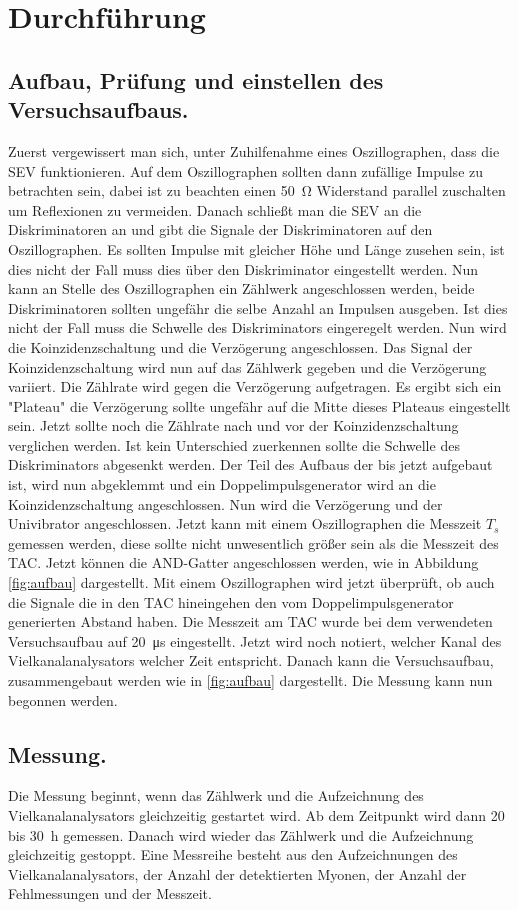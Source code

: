 \section{Durchführung}
\label{sec:Durchführung}
\subsection{Aufbau, Prüfung und einstellen des Versuchsaufbaus.}
Zuerst vergewissert man sich, unter Zuhilfenahme eines Oszillographen, dass die SEV funktionieren. 
Auf dem Oszillographen sollten dann zufällige Impulse zu betrachten sein, dabei ist zu beachten 
einen \SI{50}{\ohm} Widerstand parallel zuschalten um Reflexionen zu vermeiden. 
Danach schließt man die SEV an die Diskriminatoren an und gibt die Signale der Diskriminatoren
auf den Oszillographen. Es sollten Impulse mit gleicher Höhe und Länge zusehen sein, ist dies nicht 
der Fall muss dies über den Diskriminator eingestellt werden. Nun kann an Stelle des Oszillographen 
ein Zählwerk angeschlossen werden, beide Diskriminatoren sollten ungefähr die selbe Anzahl an 
Impulsen ausgeben. Ist dies nicht der Fall muss die Schwelle des Diskriminators eingeregelt werden. 
Nun wird die Koinzidenzschaltung und die Verzögerung angeschlossen. Das Signal der 
Koinzidenzschaltung wird nun auf das Zählwerk gegeben und die Verzögerung variiert. Die Zählrate 
wird gegen die Verzögerung aufgetragen. Es ergibt sich ein "Plateau" die Verzögerung sollte ungefähr 
auf die Mitte dieses Plateaus eingestellt sein. Jetzt sollte noch die Zählrate nach und vor 
der Koinzidenzschaltung verglichen werden. Ist kein Unterschied zuerkennen sollte die Schwelle des 
Diskriminators abgesenkt werden. 
\newline
Der Teil des Aufbaus der bis jetzt aufgebaut ist, wird nun abgeklemmt und ein Doppelimpulsgenerator 
wird an die Koinzidenzschaltung angeschlossen. Nun wird die Verzögerung und der Univibrator 
angeschlossen. Jetzt kann mit einem Oszillographen die Messzeit $T_s$ gemessen werden, diese sollte 
nicht unwesentlich größer sein als die Messzeit des TAC. Jetzt können die AND-Gatter angeschlossen 
werden, wie in Abbildung \ref{fig:aufbau} dargestellt. Mit einem Oszillographen wird jetzt 
überprüft, ob auch die Signale die in den TAC hineingehen den vom Doppelimpulsgenerator generierten 
Abstand haben. Die Messzeit am TAC wurde bei dem verwendeten Versuchsaufbau auf \SI{20}{\micro\second} 
eingestellt.
\newline 
Jetzt wird noch notiert, welcher Kanal des Vielkanalanalysators welcher Zeit entspricht. Danach kann 
die Versuchsaufbau, zusammengebaut werden wie in \ref{fig:aufbau} dargestellt. Die Messung kann nun 
begonnen werden.   
\subsection{Messung.} 
Die Messung beginnt, wenn das Zählwerk und die Aufzeichnung des Vielkanalanalysators gleichzeitig 
gestartet wird. Ab dem Zeitpunkt wird dann 20 bis \SI{30}{\hour} gemessen. 
Danach wird wieder das Zählwerk und die Aufzeichnung gleichzeitig gestoppt. Eine Messreihe besteht 
aus den Aufzeichnungen des Vielkanalanalysators, der Anzahl der detektierten Myonen, der Anzahl 
der Fehlmessungen und der Messzeit. 
